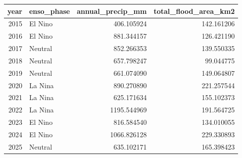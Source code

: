 \begin{tabular}{rlrr}
\toprule
year & enso\_phase & annual\_precip\_mm & total\_flood\_area\_km2 \\
\midrule
2015 & El Nino & 406.105924 & 142.161206 \\
2016 & El Nino & 881.344157 & 126.421190 \\
2017 & Neutral & 852.266353 & 139.550335 \\
2018 & Neutral & 657.798247 & 99.044775 \\
2019 & Neutral & 661.074090 & 149.064807 \\
2020 & La Nina & 890.270890 & 221.257544 \\
2021 & La Nina & 625.171634 & 155.102373 \\
2022 & La Nina & 1195.544969 & 191.564725 \\
2023 & El Nino & 816.584540 & 134.010055 \\
2024 & El Nino & 1066.826128 & 229.330893 \\
2025 & Neutral & 635.102171 & 165.398423 \\
\bottomrule
\end{tabular}
